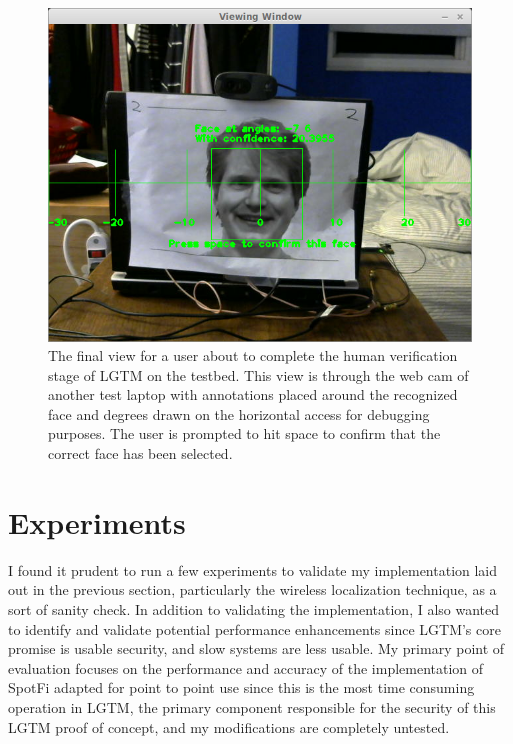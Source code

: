 \documentclass[12pt]{report}
\begin{document}
\begin{figure}[!htb]
    \begin{center}
        \caption{The final view for a user about to complete the human verification stage of LGTM on the testbed. This view is through the web cam of another test laptop with annotations placed around the recognized face and degrees drawn on the horizontal access for debugging purposes. The user is prompted to hit space to confirm that the correct face has been selected.}
        \label{figure: lgtm-confirmation}
        \includegraphics[scale=0.5]{../images/lgtm-confirmation.png}
    \end{center}
\end{figure}




\chapter{Experiments}
I found it prudent to run a few experiments to validate my implementation laid out in the previous section, particularly the wireless localization technique, as a sort of sanity check. In addition to validating the implementation, I also wanted to identify and validate potential performance enhancements since LGTM's core promise is usable security, and slow systems are less usable. My primary point of evaluation focuses on the performance and accuracy of the implementation of SpotFi adapted for point to point use since this is the most time consuming operation in LGTM, the primary component responsible for the security of this LGTM proof of concept, and my modifications are completely untested. \par
\end{document}
